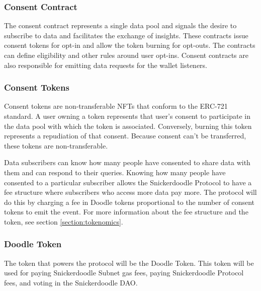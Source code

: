 \subsubsection{Consent Contract}
\label{section:ConsentContract}

The consent contract represents a single data pool and signals the desire to subscribe to data and facilitates the exchange of insights. These contracts 
issue consent tokens for opt-in and allow the token burning for opt-outs. The contracts can define eligibility and other rules around user opt-ins. 
Consent contracts are also responsible for emitting data requests for the wallet listeners.



\subsubsection{Consent Tokens}
Consent tokens are non-transferable NFTs that conform to the ERC-721 standard. A user owning a token represents that user's consent to participate in the 
data pool with which the token is associated. Conversely, burning this token represents a repudiation of that consent. Because consent can't be transferred, 
these tokens are non-transferable.


Data subscribers can know how many people have consented to share data with them and can respond to their queries. Knowing how many people have consented to 
a particular subscriber allows the Snickerdoodle Protocol to have a fee structure where subscribers who access more data pay more. The protocol will do this 
by charging a fee in Doodle tokens proportional to the number of consent tokens to emit the event. For more information about the fee structure and the token, 
see section \ref{section:tokenomics}.

\subsubsection{Doodle Token}
\label{section:DoodleToken}
The token that powers the protocol will be the Doodle Token. This token will be used for paying Snickerdoodle Subnet gas fees, paying Snickerdoodle Protocol 
fees, and voting in the Snickerdoodle DAO. 

